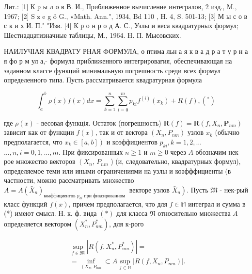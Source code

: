 \documentclass[10pt]{article}
\begin{document}
Лит.: [1] К р ы л о в В. И., Приближенное вычисление интегралов, 2 изд., M., 1967; [2] S z e g ö G., «Math. Ann.", 1934, Bd 110 , H. 4, S. 501-13; [3] М ы с о в с к и х И. П." "Изв. [4] К р о н р о д А. С., Узлы и веса квадратурных формул; Шестнадцатизначные таблицы, М., 1964. H. П. Мысовских.



НАИЛУЧІАЯ КВАДРАТУ РНАЯ ФОРМУЛА, о птима льн а я к в а д р а т у р н а я фо р м ул а,- формула приближенного интегрировағия, обеспечивающая на заданном классе функций минимальную погрешность среди всех формул определенного типа. Пусть рассматривается квадратурная формула



\[

\int_{a}^{b} \rho(x) f(x) d x=\sum_{k=1}^{n} \sum_{i=0}^{m} p_{k i} f^{(i)}\left(x_{k}\right)+R(f),\left(^{*}\right)

\]



где $\rho(x)$ - весовая функція. Остаток (погрешность) $\boldsymbol{R}(f)=\boldsymbol{R}\left(f, X_{n}, \boldsymbol{P}_{n m}\right)$ зависит как от функции $f(x)$, так и от вектора $\left(X_{n}, P_{n m}\right)$ узлов $x_{k}$ (обычно предполагается, что $\left.x_{k} \in[a, b]\right)$ и коэффициентов $p_{k i}, k=1,2, \ldots$ $\ldots, n, i=0,1, \ldots, m$. При фиксированных $n \geqslant 1$ и $m \geqslant 0$ через $A$ обозначим нек-рое множество векторов $\left(X_{n}\right.$, $P_{n m}$ ) (и, следовательно, квадратурных формул), определяемое теми или иными ограничениями на узлы и коәфффициенты (в частности, можно рассматривать множество $A=A\left(\bar{X}_{n}\right)_{\text {коәффициентов } p_{k i} \text { при фиксированном }}$ векторе узлов $\left.\bar{X}_{n}\right)$. Пусть $\mathfrak{M}$ - нек-рый класс функций $f(x)$, причем предполагается, что для $f \in \mathbb{M}$ интеграл и сумма в (*) имеют смысл. Н. к. ф. вида $(*)$ для класса $\mathfrak{N}$ относительно множества $A$ определяется вектором $\left(X_{n}^{*}, P_{n m}^{*}\right)$, для к-рого



\[

\begin{aligned}

& \sup _{f \in \mathfrak{M}}\left|R\left(f, X_{n}^{*}, P_{n m}^{*}\right)\right|= \\

& =\inf _{\left(X_{n}, P_{n m}\right.} \subset A \sup _{f \in \mathbb{M}}\left|R\left(f, X_{n}, P_{n m}\right)\right| \text {. }

\end{aligned}

\]
\end{document}
